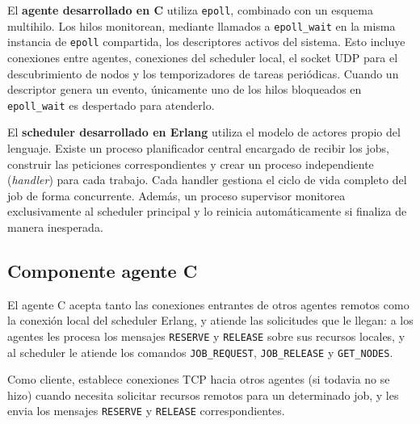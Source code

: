 \documentclass[a4paper,10pt]{article}
\begin{document}
El \textbf{agente desarrollado en C} utiliza \texttt{epoll}, combinado con un esquema multihilo. Los hilos monitorean, mediante llamados a \texttt{epoll\_wait} en la misma instancia de \texttt{epoll} compartida, los descriptores activos del sistema. Esto incluye conexiones entre agentes, conexiones del scheduler local, el socket UDP para el descubrimiento de nodos y los temporizadores de tareas periódicas. Cuando un descriptor genera un evento, únicamente uno de los hilos bloqueados en \texttt{epoll\_wait} es despertado para atenderlo. 

El \textbf{scheduler desarrollado en Erlang} utiliza el modelo de actores propio del lenguaje. Existe un proceso planificador central encargado de recibir los jobs, construir las peticiones correspondientes y crear un proceso independiente (\textit{handler}) para cada trabajo. Cada handler gestiona el ciclo de vida completo del job de forma concurrente. Además, un proceso supervisor monitorea exclusivamente al scheduler principal y lo reinicia automáticamente si finaliza de manera inesperada.


\subsection{Componente agente C}


\noindent El agente C acepta tanto las conexiones entrantes de otros agentes remotos como la conexión local del scheduler Erlang, y atiende las solicitudes que le llegan: a los agentes les procesa los mensajes \texttt{RESERVE} y \texttt{RELEASE} sobre sus recursos locales, y al scheduler le atiende los comandos \texttt{JOB\_REQUEST}, \texttt{JOB\_RELEASE} y \texttt{GET\_NODES}.

\noindent Como cliente, establece conexiones TCP hacia otros agentes (si todavia no se hizo) cuando necesita solicitar recursos
remotos para un determinado job, y les envia los mensajes \texttt{RESERVE} y \texttt{RELEASE} correspondientes.
\end{document}
